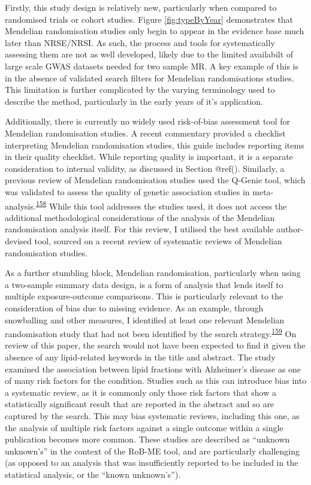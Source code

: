 \documentclass[a4paper, twoside]{templates/ociamthesis}
\begin{document}
Firstly, this study design is relatively new, particularly when compared to randomised trials or cohort studies. Figure \ref{fig:typeByYear} demonstrates that Mendelian randomisation studies only begin to appear in the evidence base much later than NRSE/NRSI. As such, the process and tools for systematically assessing them are not as well developed, likely due to the limited availabilt of large scale GWAS datasets needed for two sample MR. A key example of this is in the absence of validated search filters for Mendelian randomisations studies. This limitation is further complicated by the varying terminology used to describe the method, particularly in the early years of it's application.

Additionally, there is currently no widely used risk-of-bias assessment tool for Mendelian randomisation studies. A recent commentary provided a checklist interpreting Mendelian randomisation studies, this guide includes reporting items in their quality checklist. While reporting quality is important, it is a separate consideration to internal validity, as discussed in Section @ref(). Similarly, a previous review of Mendelian randomisation studies used the Q-Genie tool, which was validated to assess the quality of genetic association studies in meta-analysis.\textsuperscript{\protect\hyperlink{ref-sohani2015}{158}} While this tool addresses the studies used, it does not access the additional methodological considerations of the analysis of the Mendelian randomisation analysis itself. For this review, I utilised the best available author-devised tool, sourced on a recent review of systematic reviews of Mendelian randomisation studies.

As a further stumbling block, Mendelian randomisation, particularly when using a two-sample summary data design, is a form of analysis that lends itself to multiple exposure-outcome comparisons. This is particularly relevant to the consideration of bias due to missing evidence. As an example, through snowballing and other measures, I identified at least one relevant Mendelian randomisation study that had not been identified by the search strategy.\textsuperscript{\protect\hyperlink{ref-larsson2017b}{159}} On review of this paper, the search would not have been expected to find it given the absence of any lipid-related keywords in the title and abstract. The study examined the association between lipid fractions with Alzheimer's disease as one of many risk factors for the condition. Studies such as this can introduce bias into a systematic review, as it is commonly only those risk factors that show a statistically significant result that are reported in the abstract and so are captured by the search. This may bias systematic reviews, including this one, as the analysis of multiple risk factors against a single outcome within a single publication becomes more common. These studies are described as ``unknown unknown's'' in the context of the RoB-ME tool, and are particularly challenging (as opposed to an analysis that was insufficiently reported to be included in the statistical analysis, or the ``known unknown's'').
\end{document}
